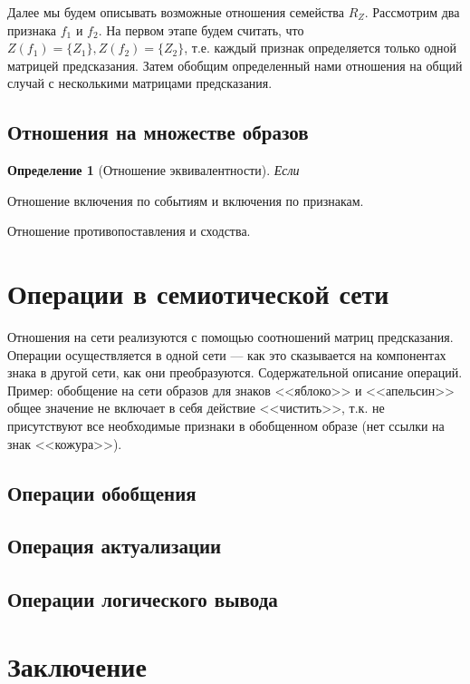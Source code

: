 \documentclass[12pt]{scrartcl}
\newtheorem{definition}{Определение}
\begin{document}
	Далее мы будем описывать возможные отношения семейства $R_Z$. Рассмотрим два признака $f_1$ и $f_2$. На первом этапе будем считать, что $Z(f_1)=\{Z_1\}, Z(f_2)=\{Z_2\}$, т.е. каждый признак определяется только одной матрицей предсказания. Затем обобщим определенный нами отношения на общий случай с несколькими матрицами предсказания.

	\subsection{Отношения на множестве образов}	
	\begin{definition}[Отношение эквивалентности]
		Если 
	\end{definition}
	
	
	Отношение включения по событиям и включения по признакам.
	
	Отношение противопоставления и сходства.
	

	\section{Операции в семиотической сети}
	Отношения на сети реализуются с помощью соотношений матриц предсказания. Операции осуществляется в одной сети --- как это сказывается на компонентах знака в другой сети, как они преобразуются. Содержательной описание операций. Пример: обобщение на сети образов для знаков <<яблоко>> и <<апельсин>> общее значение не включает в себя действие <<чистить>>, т.к. не присутствуют все необходимые признаки в обобщенном образе (нет ссылки на знак <<кожура>>).
	
	\subsection{Операции обобщения}
	
	\subsection{Операция актуализации}
	
	\subsection{Операции логического вывода}
	
	\section*{Заключение}
	
	\printbibliography
\end{document}
